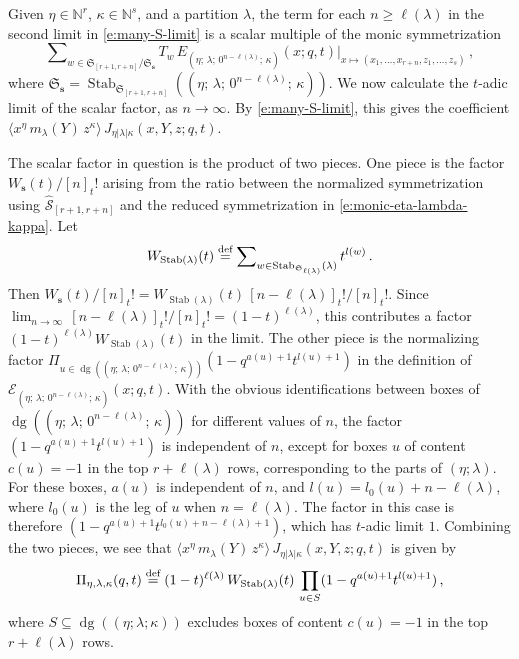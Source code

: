\documentclass[12pt]{amsart}
\theoremstyle{definition}
\theoremstyle{remark}
\newcommand{\NN}{{\mathbb N}}
\newcommand{\sS}{{\mathbf s}}
\newcommand{\Sfrak}{{\mathfrak S}}
\newcommand{\Ecal}{{\mathcal E}}
\newcommand{\Scal}{{\mathcal S}}
\DeclareMathOperator{\dg}{dg}
\DeclareMathOperator{\Stab}{Stab}
\newcommand{\hsym}{\widehat{\Scal}}    %
\newcommand{\defeq}{\mathrel{\overset{\text{{\rm def}}}{=}}}
\newcommand{\Jns}{J}           %
\begin{document}
Given $\eta \in \NN ^{r}$, $\kappa \in \NN ^{s}$, and a partition
$\lambda $, the term for each $n\geq \ell (\lambda )$ in the second
limit in \eqref{e:many-S-limit} is a scalar multiple of the monic
symmetrization
\begin{equation}\label{e:monic-eta-lambda-kappa}
\sum \nolimits _{w \in \Sfrak _{[r+1,r+n]}/ \Sfrak _{\sS }} T_{w}\, E
_{(\eta ;\, \lambda ;\, 0^{n - \ell (\lambda )};\, \kappa
)}(x;q,t)\bigr|_{x\mapsto (x_{1},\ldots,x_{r+n},
z_{1},\ldots,z_{s})}\, ,
\end{equation}
where $\Sfrak _{\sS } = \Stab _{\Sfrak _{[r+1,r+n]}} ((\eta ;\,
\lambda ;\, 0^{n - \ell (\lambda )};\, \kappa ))$.  We now calculate
the $t$-adic limit of the scalar factor, as $n\rightarrow \infty $.
By \eqref{e:many-S-limit}, this gives the coefficient $\langle x^{\eta
}\, m_{\lambda }(Y)\, z^{\kappa } \rangle \, \Jns _{\eta |\lambda
|\kappa }(x,Y,z;q,t)$.

The scalar factor in question is the product of two pieces.  One
piece is the factor $W_{\sS }(t)/[n]_{t}!$ arising from the ratio
between the normalized symmetrization using $\hsym _{[r+1,r+n]}$ and
the reduced symmetrization in \eqref{e:monic-eta-lambda-kappa}.  Let
\begin{equation}\label{e:W-Stab(lam)}
W_{\Stab (\lambda )}(t)\defeq \sum \nolimits
_{w\in \Stab _{\Sfrak _{\ell (\lambda )}}(\lambda )} t^{l(w)}\, .
\end{equation}
Then $W_{\sS }(t)/[n]_{t}! = W_{\Stab (\lambda )}(t)\, [n-\ell
(\lambda )]_{t}!/[n]_{t}!$.  Since $\lim_{n\rightarrow \infty }\, [n -
\ell (\lambda )]_{t}!/[n]_{t}! = (1-t)^{\ell (\lambda )}$, this
contributes a factor $(1-t)^{\ell (\lambda )} W_{\Stab (\lambda )}(t)$
in the limit.  The other piece is the normalizing factor $\Pi _{u\in
\dg ((\eta ;\, \lambda ;\, 0^{n-\ell (\lambda )};\, \kappa ))}
(1-q^{a(u)+1} t^{l(u)+1})$ in the definition of $\Ecal _{(\eta ;\,
\lambda ;\, 0^{n-\ell (\lambda )};\, \kappa )}(x; q,t)$.  With the
obvious identifications between boxes of $\dg ((\eta ;\, \lambda ;\,
0^{n-\ell (\lambda )};\, \kappa ))$ for different values of $n$, the
factor $(1-q^{a(u)+1} t^{l(u)+1})$ is independent of $n$, except for
boxes $u$ of content $c(u)=-1$ in the top $r+\ell (\lambda )$ rows,
corresponding to the parts of $(\eta ;\lambda )$.  For these boxes,
$a(u)$ is independent of $n$, and $l(u) = l_{0}(u)+n-\ell (\lambda )$,
where $l_{0}(u)$ is the leg of $u$ when $n=\ell (\lambda )$.  The
factor in this case is therefore $(1-q^{a(u)+1} t^{l_{0}(u)+n -\ell
(\lambda )+1})$, which has $t$-adic limit $1$.  Combining the two
pieces, we see that $\langle x^{\eta }\, m_{\lambda }(Y)\, z^{\kappa }
\rangle \, \Jns _{\eta |\lambda |\kappa }(x,Y,z;q,t)$ is given by
\begin{equation}\label{e:proto-Goodberry}
\Pi _{\eta ,\lambda ,\kappa }(q,t) \defeq (1-t)^{\ell (\lambda )}\,
W_{\Stab (\lambda )}(t)\, \prod _{u\in S} (1 - q^{a(u)+1}
t^{l(u)+1})\, ,
\end{equation}
where $S\subseteq \dg ((\eta ;\lambda ;\kappa ))$ excludes boxes of
content $c(u)=-1$ in the top $r+\ell (\lambda )$ rows.
\end{document}
